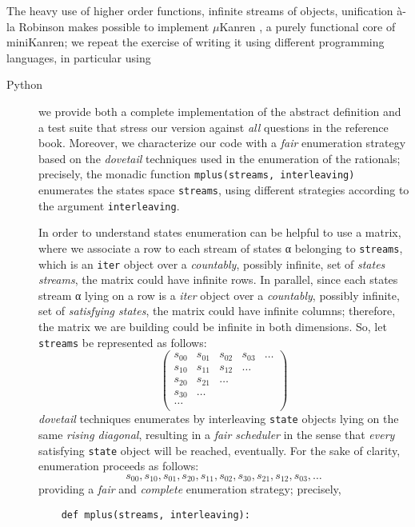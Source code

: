 The heavy use of higher order functions, infinite streams of objects,
unification \`a-la Robinson makes possible to implement $\mu$Kanren
\citep{Hemann:muKanren}, a purely functional core of miniKanren; we repeat the
exercise of writing it using different programming languages, in particular using
\begin{description}
\item[Python]
    we provide both a complete implementation of the abstract definition and a
    test suite that stress our version against \textit{all} questions in the
    reference book. Moreover, we characterize our code with a \textit{fair}
    enumeration strategy based on the \textit{dovetail} techniques used in the
    enumeration of the rationals; precisely, the monadic function
    \verb|mplus(streams, interleaving)| enumerates the states space
    \verb|streams|, using different strategies according to the argument
    \verb|interleaving|.

    In order to understand states enumeration can be helpful to use a matrix,
    where we associate a row to each stream of states α belonging to
    \verb|streams|, which is an \verb|iter| object over a \textit{countably},
    possibly infinite, set of \textit{states streams}, the matrix could have infinite
    rows.  In parallel, since each states stream α lying on a row is a \textit{iter}
    object over a \textit{countably}, possibly infinite, set of \textit{satisfying states}, the
    matrix could have infinite columns; therefore, the matrix we are building
    could be infinite in both dimensions. So, let \verb|streams| be represented as follows:
    \begin{displaymath}
        \left(\begin{array}{ccccc}
        s_{00} & s_{01} & s_{02} & s_{03} & \ldots \\
        s_{10} & s_{11} & s_{12} & \ldots &        \\
        s_{20} & s_{21} & \ldots &        &        \\
        s_{30} & \ldots &        &        &        \\
        \ldots &        &        &        &        \\
        \end{array}\right)
    \end{displaymath}
    \textit{dovetail} techniques enumerates by interleaving \verb|state|
    objects lying on the same \textit{rising diagonal}, resulting in a
    \textit{fair scheduler} in the sense that \textit{every} satisfying
    \verb|state| object will be reached, eventually. For the sake of clarity,
    enumeration proceeds as follows:
    \begin{displaymath}
    s_{00}, s_{10}, s_{01}, s_{20}, s_{11}, s_{02}, s_{30}, s_{21},
    s_{12}, s_{03}, \ldots
    \end{displaymath}
    providing a \textit{fair} and \textit{complete} enumeration strategy;
    precisely,
    \begin{verbatim}
    def mplus(streams, interleaving):


\end{verbatim}
\end{description}
